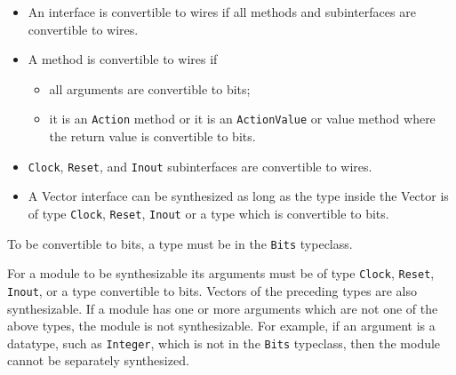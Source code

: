 \documentclass[twoside,letterpaper]{article}
\newcommand{\te}[1]{\texttt{#1}}
\begin{document}
\begin{itemize}
\item An interface is convertible to wires if all methods and
subinterfaces are convertible to wires.

\item A method is convertible to wires if 
\begin{itemize}
\item all arguments are convertible to bits;
\item it is an \te{Action} method or it is an \te{ActionValue} or
value method where the return value is convertible to bits.

\end{itemize}
\item \te{Clock}, \te{Reset}, and \te{Inout} subinterfaces are
convertible to wires. 

\item A Vector interface can be synthesized as long as the type inside the
Vector is of type \te{Clock},
\te{Reset},  \te{Inout} or a type which is convertible to bits.




\end{itemize}

To be convertible to bits, a type must be in the
\te{Bits}\index{type classes!\te{Bits}} typeclass.




For a module to be synthesizable its arguments 
must be of type \te{Clock}, \te{Reset}, \te{Inout}, or a type convertible to
bits.  Vectors of the preceding  types are also synthesizable. If a module has
one or more arguments which are not one of the above types, the module
is not synthesizable.
For example, if an argument is a datatype, such as \te{Integer}, which is not
in the \te{Bits} typeclass, then the  module cannot be
separately synthesized.
\end{document}
